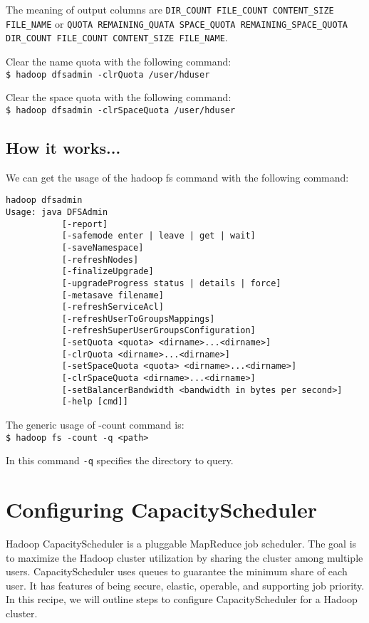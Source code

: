 The meaning of output columns are \verb|DIR_COUNT FILE_COUNT CONTENT_SIZE FILE_NAME| or \verb|QUOTA REMAINING_QUATA SPACE_QUOTA REMAINING_SPACE_QUOTA DIR_COUNT FILE_COUNT CONTENT_SIZE FILE_NAME|.

Clear the name quota with the following command: \\
\verb|$ hadoop dfsadmin -clrQuota /user/hduser|

Clear the space quota with the following command: \\
\verb|$ hadoop dfsadmin -clrSpaceQuota /user/hduser|

\subsection*{How it works...}
We can get the usage of the hadoop fs command with the following command:
\begin{verbatim}
hadoop dfsadmin
Usage: java DFSAdmin
           [-report]
           [-safemode enter | leave | get | wait]
           [-saveNamespace]
           [-refreshNodes]
           [-finalizeUpgrade]
           [-upgradeProgress status | details | force]
           [-metasave filename]
           [-refreshServiceAcl]
           [-refreshUserToGroupsMappings]
           [-refreshSuperUserGroupsConfiguration]
           [-setQuota <quota> <dirname>...<dirname>]
           [-clrQuota <dirname>...<dirname>]
           [-setSpaceQuota <quota> <dirname>...<dirname>]
           [-clrSpaceQuota <dirname>...<dirname>]
           [-setBalancerBandwidth <bandwidth in bytes per second>]
           [-help [cmd]]
\end{verbatim}

The generic usage of -count command is: \\
\verb|$ hadoop fs -count -q <path>|

In this command \verb|-q| specifies the directory to query. 

\section{Configuring CapacityScheduler}
Hadoop CapacityScheduler is a pluggable MapReduce job scheduler. The goal is to maximize the Hadoop cluster utilization by sharing the cluster among multiple users. CapacityScheduler uses queues to guarantee the minimum share of each user. It has features of being secure, elastic, operable, and supporting job priority. In this recipe, we will outline steps to configure CapacityScheduler for a Hadoop cluster.

